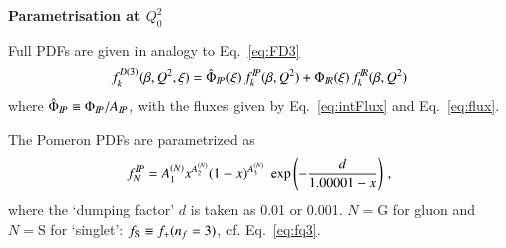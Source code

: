 {\bf Parametrisation at {$Q_0^2$}} \\
\label{sec:Par}

Full PDFs are given in analogy to Eq.~\ref{eq:FD3}
\begin{equation}
f_k^{D(3)}(\beta,Q^2,\xi) =
\hat\Phi_{I\!P}(\xi)\, f^{I\!P}_k(\beta,Q^2)
+
\Phi_{I\!R}(\xi)\, f^{I\!R}_k(\beta,Q^2)
\end{equation}
where $\hat\Phi_{I\!P} \equiv \Phi_{I\!P}/A_{I\!P}$,
with the fluxes given by Eq.~\ref{eq:intFlux} and Eq.~\ref{eq:flux}.

The Pomeron PDFs are parametrized as
\def\Cini#1#2{A^{(#1)}_#2}
\begin{equation}
\label{eq:fP0}
f^\Pom_N = \Cini N1  x^{\Cini N2} (1-x)^{\Cini N3}
  \; \exp\left(-\frac{d}{1.00001-x}\right)
\,,
\end{equation}
where the `dumping factor' $d$ is taken as 0.01 or 0.001.
$N = \mathrm G$ for gluon and $N = \mathrm S$ for `singlet': $f_{\rm S} \equiv f_+(n_f=3)$,
cf. Eq.~\ref{eq:fq3}.








